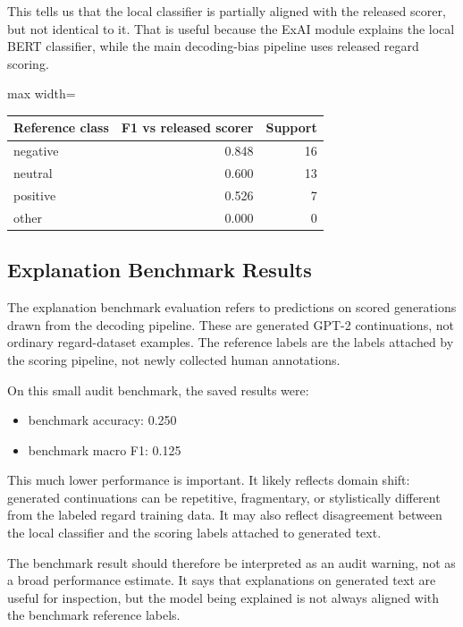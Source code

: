 \documentclass[11pt]{article}
\begin{document}
This tells us that the local classifier is partially aligned with the released scorer, but not identical to it. That is useful because the ExAI module explains the local BERT classifier, while the main decoding-bias pipeline uses released regard scoring.

\begin{center}
\footnotesize
\begin{adjustbox}{max width=\textwidth}
\begin{tabular}{lrr}
\toprule
Reference class & F1 vs released scorer & Support \\
\midrule
negative & 0.848 & 16 \\
neutral & 0.600 & 13 \\
positive & 0.526 & 7 \\
other & 0.000 & 0 \\
\bottomrule
\end{tabular}
\end{adjustbox}
\end{center}


\subsection*{Explanation Benchmark Results}

The explanation benchmark evaluation refers to predictions on scored generations drawn from the decoding pipeline. These are generated GPT-2 continuations, not ordinary regard-dataset examples. The reference labels are the labels attached by the scoring pipeline, not newly collected human annotations.

On this small audit benchmark, the saved results were:

\begin{itemize}
\item benchmark accuracy: 0.250
\item benchmark macro F1: 0.125
\end{itemize}

This much lower performance is important. It likely reflects domain shift: generated continuations can be repetitive, fragmentary, or stylistically different from the labeled regard training data. It may also reflect disagreement between the local classifier and the scoring labels attached to generated text.

The benchmark result should therefore be interpreted as an audit warning, not as a broad performance estimate. It says that explanations on generated text are useful for inspection, but the model being explained is not always aligned with the benchmark reference labels.
\end{document}
